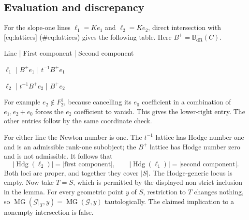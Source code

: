 \documentclass[10pt]{article}
\begin{document}
\subsection*{Evaluation and discrepancy}
For the slope-one lines \(\ell_1=K e_1\) and \(\ell_2=K e_2\), direct intersection with [eq:lattices] (\#eq:lattices) gives the following table. Here \(B^+=\mathbb B_{\mathrm{dR}}^+(C)\).\par
Line | First component | Second component\par
\(\ell_1\) | \(B^+e_1\) | \(t^{-1}B^+e_1\)\par
\(\ell_2\) | \(t^{-1}B^+e_2\) | \(B^+e_2\)\par
For example \(e_2\notin F_2^1\), because cancelling its \(e_0\) coefficient in a combination of \(e_1,e_2+e_0\) forces the \(e_2\) coefficient to vanish. This gives the lower-right entry. The other entries follow by the same coordinate check.\par
For either line the Newton number is one. The \(t^{-1}\) lattice has Hodge number one and is an admissible rank-one subobject; the \(B^+\) lattice has Hodge number zero and is not admissible. It follows that \[|\operatorname{Hdg}(\ell_2)|=|\text{first component}|,\qquad
 |\operatorname{Hdg}(\ell_1)|=|\text{second component}|.\] Both loci are proper, and together they cover \(|S|\). The Hodge-generic locus is empty. Now take \(T=S\), which is permitted by the displayed non-strict inclusion in the lemma. For every geometric point \(y\) of \(S\), restriction to \(T\) changes nothing, so \(\operatorname{MG}(\mathcal G|_T,y)=\operatorname{MG}(\mathcal G,y)\) tautologically. The claimed implication to a nonempty intersection is false.\par
\end{document}
